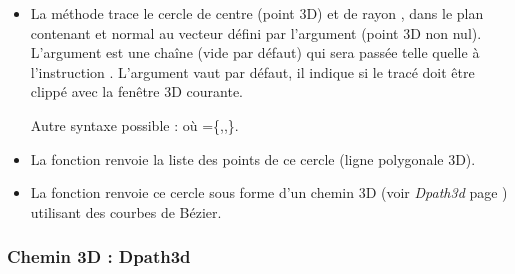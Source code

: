 \begin{itemize}
    \item La méthode  trace le cercle de centre  (point 3D) et de rayon , dans le plan contenant  et normal au vecteur défini par l'argument  (point 3D non nul). L'argument  est une chaîne (vide par défaut) qui sera passée telle quelle à l'instruction \drawcmd . L'argument  vaut \false par défaut, il indique si le tracé doit être clippé avec la fenêtre 3D courante. 
    
    Autre syntaxe possible :   où =\{,,\}.
    
    \item La fonction  renvoie la liste des points de ce cercle (ligne polygonale 3D). 
    
    \item La fonction  renvoie ce cercle sous forme d'un chemin 3D (voir \emph{Dpath3d} page \pageref{Dpath3d}) utilisant des courbes de Bézier.
\end{itemize}
    
\subsubsection{Chemin 3D : Dpath3d}\label{Dpath3d}

